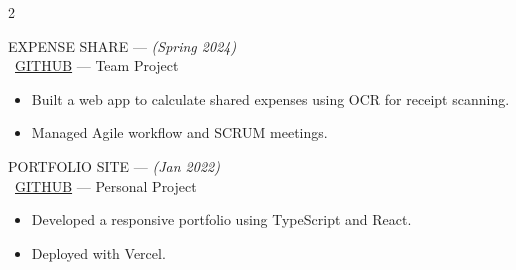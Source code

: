 \documentclass[10pt,letterpaper,ragged2e,withhyper]{altacv}
\newcommand{\experience}[4]{
  \textcolor{subheading}{\MakeUppercase{#1}} \hspace{0.2cm}--- \hspace{0.2cm} \emph{(#2)}\\
  {\MakeUppercase{#3}} \hspace{0.2cm}---\hspace{0.2cm}   #4
  \vspace{4pt}  %
}
\begin{document}

\begin{paracol}{2}

\begin{leftcolumn}


\divider


\divider



\experience{Expense Share}{Spring 2024}{\faGithub\ \href{https://github.com/avery-wagner/ExpenseShare}{GitHub}}{Team Project}
\begin{itemize}
  \item Built a web app to calculate shared expenses using OCR for receipt scanning.
  \item Managed Agile workflow and SCRUM meetings.
\end{itemize}

\divider

\experience{Portfolio Site}{Jan 2022}{\faGithub\ \href{https://github.com/avery-wagner/my-portfolio}{GitHub}}{Personal Project}
\begin{itemize}
  \item Developed a responsive portfolio using TypeScript and React.
  \item Deployed with Vercel.
\end{itemize}



\end{leftcolumn}
\end{paracol}
\end{document}
